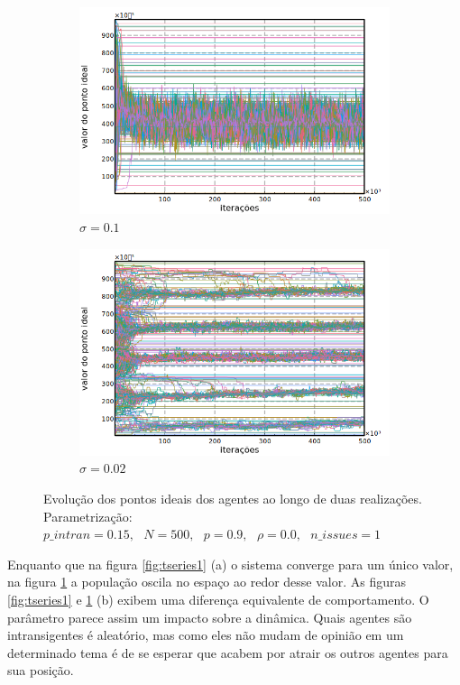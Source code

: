 \begin{figure}[H]
    \centering
    \begin{subfigure}[b]{0.49\textwidth}
      \includegraphics[width=\textwidth]{ims/timeseries3.png}
      \caption{\( \sigma = 0.1\) }
    \end{subfigure}
    \begin{subfigure}[b]{0.49\textwidth}
      \includegraphics[width=\textwidth]{ims/timeseries4.png}
       \caption{\(\sigma = 0.02\) }
      \end{subfigure}
      \caption{Evolução dos pontos ideais dos agentes ao longo de duas realizações.
        Parametrização: \(p\_intran = 0.15, \text{ } N = 500,  \text{ }   p =
        0.9,  \text{ }  \rho = 0.0,  \text{ }  n\_issues = 1 \)}
      \label{fig:tseries2}
    \end{figure}
    

    Enquanto que na figura \ref{fig:tseries1} (a) o sistema converge para um
    único valor, na figura \ref{fig:tseries2} a população oscila no espaço ao
    redor desse valor. As figuras \ref{fig:tseries1} e \ref{fig:tseries2} (b)
    exibem uma diferença equivalente de comportamento. O parâmetro parece assim um impacto sobre a
    dinâmica. Quais agentes são intransigentes é aleatório, mas como eles não
    mudam de opinião em um determinado tema é de se esperar que acabem por
    atrair os outros agentes para sua posição. 



